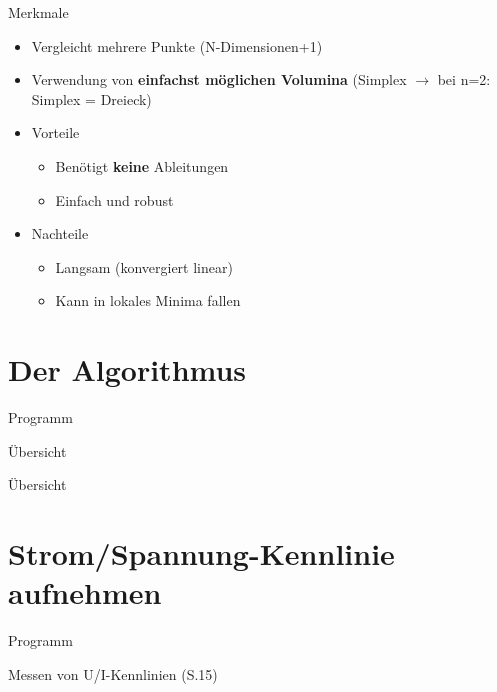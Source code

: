 \documentclass[\outputformat]{beamer}
\begin{document}
\begin{frame}{Merkmale}
\begin{itemize}
	\item Vergleicht mehrere Punkte (N-Dimensionen+1)
	\item Verwendung von \textbf{einfachst möglichen Volumina} (Simplex $\rightarrow$ bei n=2: Simplex = Dreieck)
	\item Vorteile
	\begin{itemize}
		\item Benötigt \textbf{keine} Ableitungen
		\item Einfach und robust
	\end{itemize}
	\item Nachteile
	\begin{itemize}
		\item Langsam (konvergiert linear)
		\item Kann in lokales Minima fallen
	\end{itemize} 
\end{itemize}
\end{frame}

\section{Der Algorithmus} 
\begin{frame}{Programm}\tableofcontents[currentsection]\end{frame}

\begin{frame}{Übersicht}
\newcommand{\highlight}{white}

\end{frame}
\begin{frame}{Übersicht}
\newcommand{\highlight}{green}

\end{frame}



\section{Strom/Spannung-Kennlinie aufnehmen}
\begin{frame}{Programm}\tableofcontents[currentsection]\end{frame}

\begin{frame}{Messen von U/I-Kennlinien (S.15)}

\end{frame}
\end{document}
